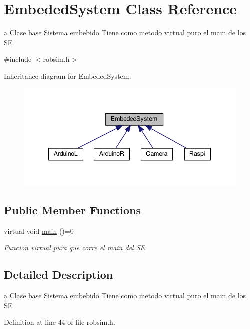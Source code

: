 \hypertarget{classEmbededSystem}{}\section{Embeded\+System Class Reference}
\label{classEmbededSystem}


a Clase base Sistema embebido Tiene como metodo virtual puro el main de los SE  




{\ttfamily \#include $<$robsim.\+h$>$}



Inheritance diagram for Embeded\+System\+:
\nopagebreak
\begin{figure}[H]
\begin{center}
\leavevmode
\includegraphics[width=340pt]{classEmbededSystem__inherit__graph}
\end{center}
\end{figure}
\subsection*{Public Member Functions}
\begin{DoxyCompactItemize}
\item 
virtual void \hyperlink{classEmbededSystem_a3a333d4954af4068f5e97301b4f55c48}{main} ()=0
\begin{DoxyCompactList}\small\item\em Funcion virtual pura que corre el main del SE. \end{DoxyCompactList}\end{DoxyCompactItemize}


\subsection{Detailed Description}
a Clase base Sistema embebido Tiene como metodo virtual puro el main de los SE 

Definition at line 44 of file robsim.\+h.




